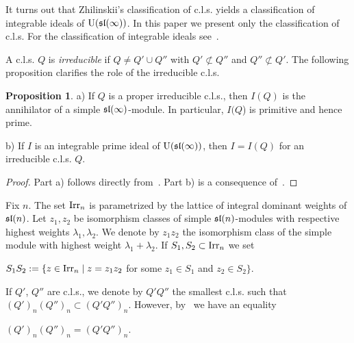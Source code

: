 \documentclass[10pt]{amsart}\oddsidemargin -1mm \evensidemargin -1mm \topmargin -15mm\headheight5mm \headsep 3.5mm \textheight 245mm\textwidth 170mm %
\theoremstyle{definition}\newtheorem{theorem}{Theorem}[section]\newtheorem{lemma}[theorem]{Lemma}\newtheorem{remark}[theorem]{Remark}\newtheorem{proposition}[theorem]{Proposition}\newtheorem{corollary}[theorem]{Corollary}\newtheorem{definition}[theorem]{Definition}\newtheorem{Ex}[theorem]{Example}
\begin{document}
It turns out that Zhilinskii's classification of c.l.s. yields a
classification of integrable ideals of $\operatorname{\mathrm{U}}(\frak{sl}(\infty))$. In this paper we present only the classification of c.l.s. For the classification of integrable ideals see~\cite[Theorem~7.9]{PP}.

A c.l.s. $Q$ is {\it irreducible} if $Q\ne Q'\cup Q''$ with
$Q'\not\subset Q''$ and $Q''\not\subset Q'$. The following proposition clarifies the role of the irreducible c.l.s.

\begin{proposition}\label{Pintm}a) If $Q$ is a proper irreducible c.l.s., then $I(Q)$ is the annihilator of a simple $\frak{sl}(\infty)$-module. In particular, $I(Q$) is primitive and hence prime.

b) If $I$ is an integrable prime ideal of $\operatorname{\mathrm{U}}(\frak{sl}(\infty))$, then $I=I(Q)$ for an irreducible c.l.s. $Q$. \end{proposition}
\begin{proof}Part a) follows directly from{~\cite[Lemma 1.1.2]{Zh2}}. Part b) is a consequence of~\cite[Theorem 7.9]{PP}.\end{proof}


Fix $n$. The set $\operatorname{\mathrm{Irr}}_n$ is parametrized by the lattice of integral dominant weights of $\frak{sl}(n)$. Let $z_1, z_2$ be
isomorphism classes of simple $\frak{sl}(n)$-modules with respective
highest weights $\lambda_1, \lambda_2$. We denote by $z_1z_2$ the
isomorphism class of the simple module with highest weight
$\lambda_1+\lambda_2$. If $S_1, S_2\subset\operatorname{\mathrm{Irr}}_n$ we
set\begin{center}$S_1S_2:=\{z\in\operatorname{\mathrm{Irr}}_n\mid z=z_1z_2$ for some
$z_1\in S_1$ and $z_2\in S_2\}$.\end{center}If $Q'$, $Q''$ are
c.l.s., we denote by $Q'Q''$ the smallest c.l.s. such that
$(Q')_n(Q'')_n\subset(Q'Q'')_n$.
However, by~\cite{Zh2} we have an equality\begin{center}$(Q')_n(Q'')_n=(Q'Q'')_n$.\end{center}
\end{document}
